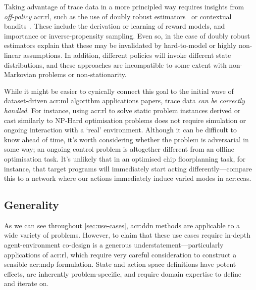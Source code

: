 Taking advantage of trace data in a more principled way requires insights from \emph{off-policy} \gls{acr:rl}, such as the use of doubly robust estimators~\parencite{DBLP:conf/hotnets/BartulovicJBSS17} or contextual bandits~\parencite{DBLP:conf/hotnets/LecuyerLNSSS17}.
These include the derivation or learning of reward models, and importance or inverse-propensity sampling.
Even so, in the case of doubly robust estimators \citeauthor{DBLP:conf/hotnets/BartulovicJBSS17} explain that these may be invalidated by hard-to-model or highly non-linear assumptions.
In addition, different policies will invoke different state distributions, and these approaches are incompatible to some extent with non-Markovian problems or non-stationarity.

While it might be easier to cynically connect this goal to the initial wave of dataset-driven \gls{acr:ml} algorithm applications papers, trace data \emph{can be correctly handled}.
For instance, using \gls{acr:rl} to solve static problem instances derived or cast similarly to \textsf{NP}-Hard optimisation problems does not require simulation or ongoing interaction with a `real' environment.
Although it can be difficult to know ahead of time, it's worth considering whether the problem is adversarial in some way; an ongoing control problem is altogether different from an offline optimisation task.
It's unlikely that in an optimised chip floorplanning task, for instance, that target programs will immediately start acting differently---compare this to a network where our actions immediately induce varied modes in \glspl{acr:cca}.

\subsection{Generality}
As we can see throughout \cref{sec:use-cases}, \gls{acr:ddn} methods are applicable to a wide variety of problems.
However, to claim that these use cases require in-depth agent-environment co-design is a generous understatement---particularly applications of \gls{acr:rl}, which require very careful consideration to construct a sensible \gls{acr:mdp} formulation.
State and action space definitions have potent effects, are inherently problem-specific, and require domain expertise to define and iterate on.

